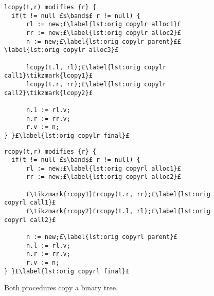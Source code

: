 \documentclass[runningheads,a4paper]{llncs}
\newcommand{\tikzmark}[1]{\tikz[overlay,remember picture] \node (#1) {};}
\DeclareMathOperator{\band}{\bm{\;\land\;}}
\begin{document}
\begin{figure}[htbp]%
\centering%
\noindent\begin{minipage}{.45\textwidth}%
\begin{lstlisting}[style=bl,label=lst:copylr,name=copyex]
lcopy(t,r) modifies {r} {
  if(t != null £$\band$£ r != null) {
      rl := new;£\label{lst:orig copylr alloc1}£
      rr := new;£\label{lst:orig copylr alloc2}£
      n := new;£\label{lst:orig copylr parent}££\label{lst:orig copylr alloc3}£

      lcopy(t.l, rl);£\label{lst:orig copylr call1}\tikzmark{lcopy1}£
      lcopy(t.r, rr);£\label{lst:orig copylr call2}\tikzmark{lcopy2}£

      n.l := rl.v;
      n.r := rr.v;
      r.v := n;
} }£\label{lst:orig copylr final}£
\end{lstlisting}%
\end{minipage}%
\begin{minipage}{.45\textwidth}%
\begin{lstlisting}[style=bl,label=lst:copyrl,firstnumber=auto,name=copyex]
rcopy(t,r) modifies {r} {
  if(t != null £$\band$£ r != null) {
      rl := new;£\label{lst:orig copyrl alloc1}£
      rr := new;£\label{lst:orig copyrl alloc2}£

      £\tikzmark{rcopy1}£rcopy(t.r, rr);£\label{lst:orig copyrl call1}£
      £\tikzmark{rcopy2}£rcopy(t.l, rl);£\label{lst:orig copyrl call2}£

      n := new;£\label{lst:orig copyrl parent}£
      n.l := rl.v;
      n.r := rr.v;
      r.v := n;
} }£\label{lst:orig copyrl final}£
\end{lstlisting}%
\end{minipage}%
\caption[Two procedures, \copylr{} and \copyrl{}, that copy a binary tree]{Both procedures copy a binary tree.
\label{fig:copy tree}}%
%
\end{figure}
\end{document}
